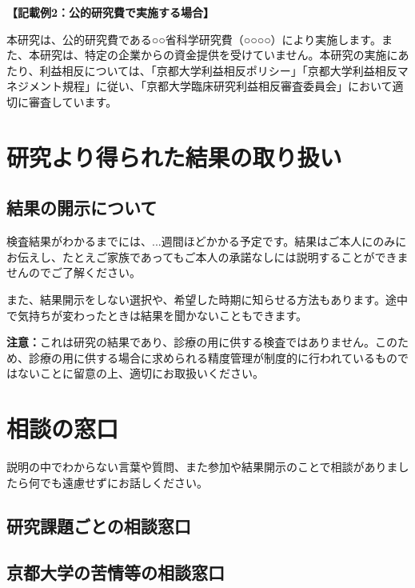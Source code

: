 \documentclass[a4paper,11pt,lualatex,ja=standard]{bxjsarticle}
\begin{document}
\textbf{【記載例2：公的研究費で実施する場合】}

本研究は、公的研究費である○○省科学研究費（○○○○）により実施します。また、本研究は、特定の企業からの資金提供を受けていません。本研究の実施にあたり、利益相反については、「京都大学利益相反ポリシー」「京都大学利益相反マネジメント規程」に従い、「京都大学臨床研究利益相反審査委員会」において適切に審査しています。

\section{研究より得られた結果の取り扱い}

\subsection{結果の開示について}

検査結果がわかるまでには、...週間ほどかかる予定です。結果はご本人にのみにお伝えし、たとえご家族であってもご本人の承諾なしには説明することができませんのでご了解ください。

また、結果開示をしない選択や、希望した時期に知らせる方法もあります。途中で気持ちが変わったときは結果を聞かないこともできます。

\textbf{注意：}これは研究の結果であり、診療の用に供する検査ではありません。このため、診療の用に供する場合に求められる精度管理が制度的に行われているものではないことに留意の上、適切にお取扱いください。

\section{相談の窓口}

説明の中でわからない言葉や質問、また参加や結果開示のことで相談がありましたら何でも遠慮せずにお話しください。

\subsection{研究課題ごとの相談窓口}


\subsection{京都大学の苦情等の相談窓口}
\end{document}
